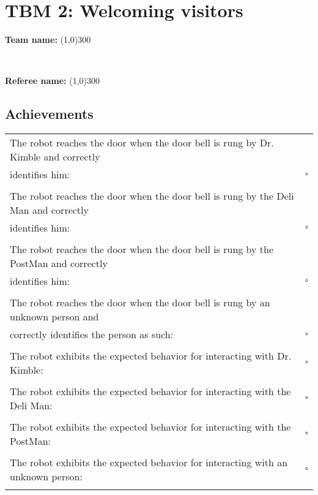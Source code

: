 \section*{TBM 2: Welcoming visitors}
\vspace{0.1cm} \begin{large} \textbf{Team name:} \line(1,0){300} \end{large} \vspace{0.7cm} \\ 
\vspace{0.1cm} \begin{large} \textbf{Referee name:} \line(1,0){300} \end{large}

\subsection*{Achievements}
\begin{tabular}{ l c}
The robot reaches the door when the door bell is rung by Dr. Kimble and correctly & \\
identifies him: & $\square$ \\ \\

The robot reaches the door when the door bell is rung by the Deli Man and correctly & \\
identifies him: & $\square$ \\ \\

The robot reaches the door when the door bell is rung by the PostMan and correctly & \\
identifies him: & $\square$ \\ \\

The robot reaches the door when the door bell is rung by an unknown person and & \\
correctly identifies the person as such: & $\square$ \\ \\

The robot exhibits the expected behavior for interacting with Dr. Kimble: & $\square$ \\ \\

The robot exhibits the expected behavior for interacting with the Deli Man: & $\square$ \\ \\
The robot exhibits the expected behavior for interacting with the PostMan: & $\square$ \\ \\
The robot exhibits the expected behavior for interacting with an unknown person: & $\square$ \\ \\
\end{tabular}


